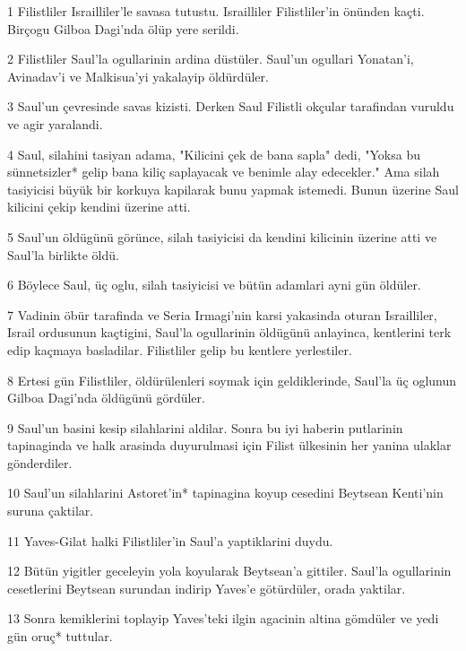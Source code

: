 \par 1 Filistliler Israilliler'le savasa tutustu. Israilliler Filistliler'in önünden kaçti. Birçogu Gilboa Dagi'nda ölüp yere serildi.
\par 2 Filistliler Saul'la ogullarinin ardina düstüler. Saul'un ogullari Yonatan'i, Avinadav'i ve Malkisua'yi yakalayip öldürdüler.
\par 3 Saul'un çevresinde savas kizisti. Derken Saul Filistli okçular tarafindan vuruldu ve agir yaralandi.
\par 4 Saul, silahini tasiyan adama, "Kilicini çek de bana sapla" dedi, "Yoksa bu sünnetsizler* gelip bana kiliç saplayacak ve benimle alay edecekler." Ama silah tasiyicisi büyük bir korkuya kapilarak bunu yapmak istemedi. Bunun üzerine Saul kilicini çekip kendini üzerine atti.
\par 5 Saul'un öldügünü görünce, silah tasiyicisi da kendini kilicinin üzerine atti ve Saul'la birlikte öldü.
\par 6 Böylece Saul, üç oglu, silah tasiyicisi ve bütün adamlari ayni gün öldüler.
\par 7 Vadinin öbür tarafinda ve Seria Irmagi'nin karsi yakasinda oturan Israilliler, Israil ordusunun kaçtigini, Saul'la ogullarinin öldügünü anlayinca, kentlerini terk edip kaçmaya basladilar. Filistliler gelip bu kentlere yerlestiler.
\par 8 Ertesi gün Filistliler, öldürülenleri soymak için geldiklerinde, Saul'la üç oglunun Gilboa Dagi'nda öldügünü gördüler.
\par 9 Saul'un basini kesip silahlarini aldilar. Sonra bu iyi haberin putlarinin tapinaginda ve halk arasinda duyurulmasi için Filist ülkesinin her yanina ulaklar gönderdiler.
\par 10 Saul'un silahlarini Astoret'in* tapinagina koyup cesedini Beytsean Kenti'nin suruna çaktilar.
\par 11 Yaves-Gilat halki Filistliler'in Saul'a yaptiklarini duydu.
\par 12 Bütün yigitler geceleyin yola koyularak Beytsean'a gittiler. Saul'la ogullarinin cesetlerini Beytsean surundan indirip Yaves'e götürdüler, orada yaktilar.
\par 13 Sonra kemiklerini toplayip Yaves'teki ilgin agacinin altina gömdüler ve yedi gün oruç* tuttular.



